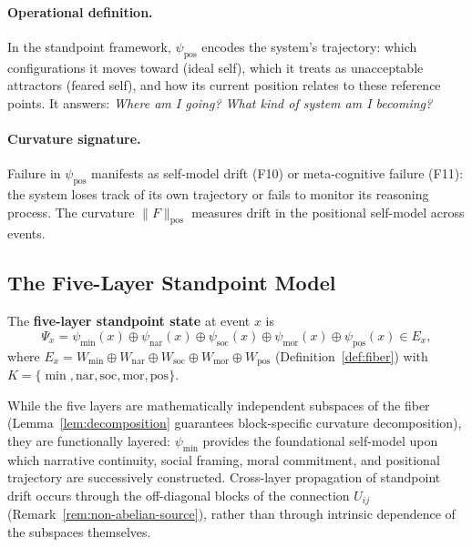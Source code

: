 \paragraph{Operational definition.}
In the standpoint framework, $\psi_{\mathrm{pos}}$ encodes the system's trajectory:
which configurations it moves toward (ideal self), which it treats as unacceptable
attractors (feared self), and how its current position relates to these reference points.
It answers: \emph{Where am I going? What kind of system am I becoming?}

\paragraph{Curvature signature.}
Failure in $\psi_{\mathrm{pos}}$ manifests as self-model drift (F10) or meta-cognitive
failure (F11): the system loses track of its own trajectory or fails to monitor its
reasoning process. The curvature $\|F\|_{\mathrm{pos}}$ measures drift in the positional
self-model across events.

\subsection{The Five-Layer Standpoint Model}
\label{sec:full-model}

\begin{definition}
\label{def:five-layer}
The \textbf{five-layer standpoint state} at event $x$ is
\[
    \Psi_x = \psi_{\min}(x) \oplus \psi_{\mathrm{nar}}(x) \oplus \psi_{\mathrm{soc}}(x)
    \oplus \psi_{\mathrm{mor}}(x) \oplus \psi_{\mathrm{pos}}(x) \in E_x,
\]
where $E_x = W_{\min} \oplus W_{\mathrm{nar}} \oplus W_{\mathrm{soc}} \oplus
W_{\mathrm{mor}} \oplus W_{\mathrm{pos}}$ (Definition~\ref{def:fiber}) with
$K = \{\min, \mathrm{nar}, \mathrm{soc}, \mathrm{mor}, \mathrm{pos}\}$.
\end{definition}

While the five layers are mathematically independent subspaces of the fiber
(Lemma~\ref{lem:decomposition} guarantees block-specific curvature decomposition), they
are functionally layered: $\psi_{\min}$ provides the foundational self-model upon which
narrative continuity, social framing, moral commitment, and positional trajectory are
successively constructed. Cross-layer propagation of standpoint drift occurs through the
off-diagonal blocks of the connection $U_{ij}$
(Remark~\ref{rem:non-abelian-source}), rather than through intrinsic dependence of the
subspaces themselves.
